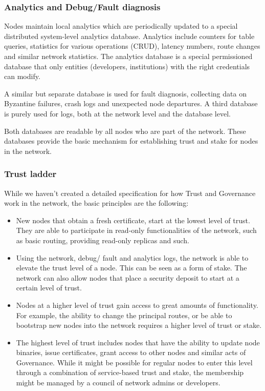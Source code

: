 \subsubsection{Analytics and Debug/Fault diagnosis}
Nodes maintain local analytics which are periodically updated to a special distributed system-level analytics
database. Analytics include counters for table queries, statistics for various operations (CRUD), latency numbers, route
changes and similar network statistics. The analytics database is a special permissioned database that only entities
(developers, institutions) with the right credentials can modify.

A similar but separate database is used for fault diagnosis, collecting data on Byzantine failures, crash logs and
unexpected node departures. A third database is purely used for logs, both at the network level and the database level.

Both databases are readable by all nodes who are part of the network. These databases provide the basic mechanism for
establishing trust and stake for nodes in the network.

\subsubsection{Trust ladder}
While we haven't created a detailed specification for how Trust and Governance work in the network, the basic principles
are the following:
\begin{itemize}
    \item New nodes that obtain a fresh certificate, start at the lowest level of trust. They are able to participate in
        read-only functionalities of the network, such as basic routing, providing read-only replicas and such.
    \item Using the network, debug/ fault and analytics logs, the network is able to elevate the trust level of a node.
        This can be seen as a form of stake. The network can also allow nodes that place a security deposit to start at
        a certain level of trust.
    \item Nodes at a higher level of trust gain access to great amounts of functionality. For example, the ability to
        change the principal routes, or be able to bootstrap new nodes into the network requires a higher level of trust
        or stake.
    \item The highest level of trust includes nodes that have the ability to update node binaries, issue certificates,
        grant access to other nodes and similar acts of Governance. While it might be possible for regular nodes to
        enter this level through a combination of service-based trust and stake, the membership might be managed by a
        council of network admins or developers.
\end{itemize}
